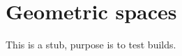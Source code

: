 \documentclass[../main.tex]{subfiles}
\begin{document}
\setcounter{chapter}{2}
\setcounter{section}{3}

\section{Geometric spaces}

This is a stub, purpose is to test builds.
\end{document}
